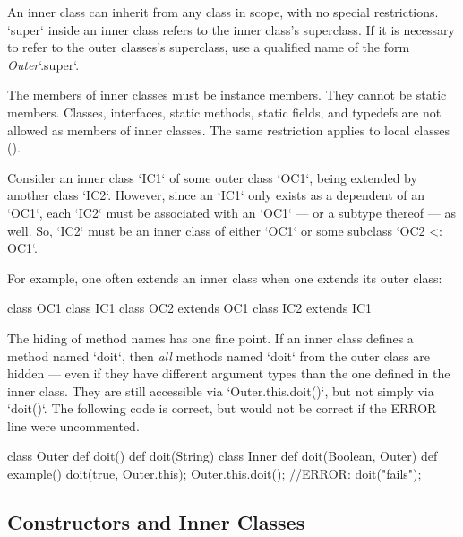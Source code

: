 An inner class can inherit from any class in scope,
with no special restrictions. \xcd`super` inside an inner class refers to the
inner class's superclass. If it is necessary to refer to the outer classes's
superclass, use a qualified name of the form {\em Outer}\xcd`.super`.

The members of inner classes must be instance members.  They cannot be static
members.  Classes, interfaces, static methods, static fields, and typedefs are
not allowed as members of inner classes. 
The same restriction applies to local classes ().

Consider
an inner class \xcd`IC1` of some outer class \xcd`OC1`, being extended by 
another class \xcd`IC2`. However, since an \xcd`IC1` only exists as a
dependent of an \xcd`OC1`, each \xcd`IC2` must be associated with an \xcd`OC1`
--- or a subtype thereof --- as well.   So, \xcd`IC2` must be an inner class
of either \xcd`OC1` or some subclass \xcd`OC2 <: OC1`.

\begin{ex}For example, one often extends an
inner class when one extends its outer class: 
\begin{xten}
class OC1 {
   class IC1 {}
}
class OC2 extends OC1 {
   class IC2 extends IC1 {} 
}
\end{xten}
%
\end{ex}


The hiding of method names has one fine point.  If an inner class defines a
method named \xcd`doit`, then {\em all} methods named \xcd`doit` from the
outer class are hidden --- even if they have different argument types than the
one defined in the inner class.
They are still accessible via
\xcd`Outer.this.doit()`, but not simply via \xcd`doit()`.  The following code
is correct, but would not be correct if the ERROR line were uncommented.

\begin{xten}
class Outer {
  def doit() {}
  def doit(String) {}
  class Inner { 
     def doit(Boolean, Outer) {}
     def example() {
        doit(true, Outer.this);
        Outer.this.doit();
        //ERROR: doit("fails");
     }
  }
}
\end{xten}
%


\subsection{Constructors and Inner Classes}
\label{sect:InnerClassCtor}

